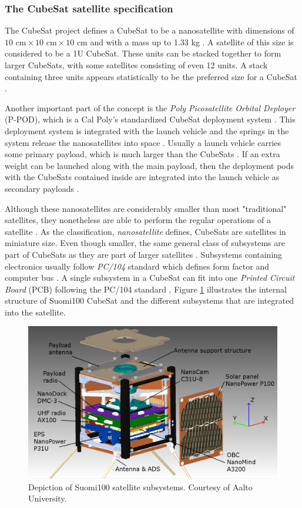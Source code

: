 \documentclass[english,12pt,a4paper,pdftex,elec,utf8]{aaltothesis}
\begin{document}
\subsubsection{The CubeSat satellite specification}
The CubeSat project defines a CubeSat to be a nanosatellite with dimensions of ${10 \textrm{ cm} \times10 \textrm{ cm} \times{10} \textrm{ cm}}$ and with a mass up to 1.33 kg \cite{cds}. A satellite of this size is considered to be a 1U CubeSat. These units can be stacked together to form larger CubeSats, with some satellites consisting of even 12 units. A stack containing three units appears statistically to be the preferred size for a CubeSat \cite{Swart2016}. \par
Another important part of the concept is the \textit{Poly Picosatellite Orbital Deployer} (P-POD), which is a Cal Poly’s standardized CubeSat deployment system \cite{cds}. This deployment system is integrated with the launch vehicle and the springs in the system release the nanosatellites into space \cite{cds}. Usually a launch vehicle carries some primary payload, which is much larger than the CubeSats \cite{nasacubesat1}. If an extra weight can be launched along with the main payload, then the deployment pods with the CubeSats contained inside are integrated into the launch vehicle as secondary payloads \cite{nasacubesat1}. \par 
Although these nanosatellites are considerably smaller than most "traditional" satellites, they nonetheless are able to perform the regular operations of a satellite \cite{openorbiter}. As the classification, \textit{nanosatellite} defines, CubeSats are satellites in miniature size. Even though smaller, the same general class of subsystems are part of CubeSats as they are part of larger satellites \cite{openorbiter}. Subsystems containing electronics usually follow \textit{PC/104} standard which defines form factor and computer bus \cite{reliabilitycubesatelbus}. A single subsystem in a CubeSat can fit into one \textit{Printed Circuit Board} (PCB) following the PC/104 standard \cite{reliabilitycubesatelbus}.
Figure \ref{s100cad} illustrates the internal structure of Suomi100 CubeSat and the different subsystems that are integrated into the satellite.\par 
\begin{figure}[!h]
\centering
\includegraphics[scale=0.2]{s100cad}
\caption{Depiction of Suomi100 satellite subsystems. Courtesy of Aalto University.}
\label{s100cad}
\end{figure}  
\end{document}
